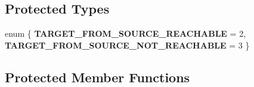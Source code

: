 \subsection*{Protected Types}
\begin{DoxyCompactItemize}
\item 
\mbox{\label{classmaxflow__pp_abd042f1baa6a6200b5bbed755f400d2d}} 
enum \{ {\bfseries T\+A\+R\+G\+E\+T\+\_\+\+F\+R\+O\+M\+\_\+\+S\+O\+U\+R\+C\+E\+\_\+\+R\+E\+A\+C\+H\+A\+B\+LE} = 2, 
{\bfseries T\+A\+R\+G\+E\+T\+\_\+\+F\+R\+O\+M\+\_\+\+S\+O\+U\+R\+C\+E\+\_\+\+N\+O\+T\+\_\+\+R\+E\+A\+C\+H\+A\+B\+LE} = 3
 \}
\end{DoxyCompactItemize}
\subsection*{Protected Member Functions}
